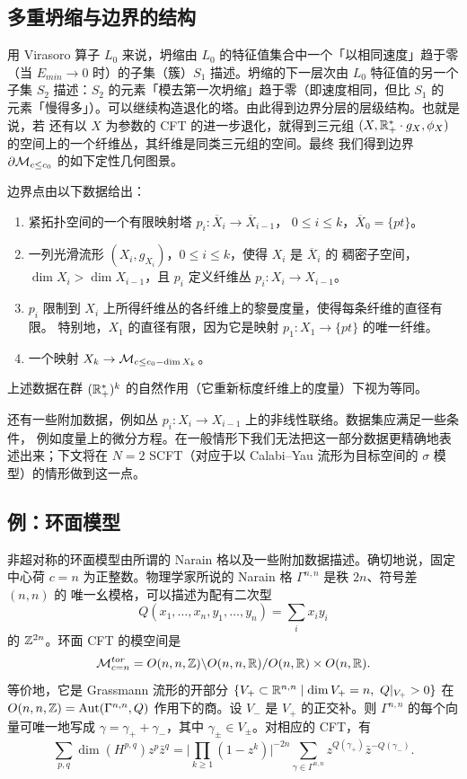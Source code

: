 \subsection{多重坍缩与边界的结构}

用 Virasoro 算子 $L_0$ 来说，坍缩由 $L_0$ 的特征值集合中一个「以相同速度」趋于零
（当 $E_{min}\to0$ 时）的子集（簇）$S_1$ 描述。坍缩的下一层次由 $L_0$ 特征值的另一个
子集 $S_2$ 描述：$S_2$ 的元素「模去第一次坍缩」趋于零（即速度相同，但比 $S_1$ 的
元素「慢得多」）。可以继续构造退化的塔。由此得到边界分层的层级结构。也就是说，若
还有以 $X$ 为参数的 CFT 的进一步退化，就得到三元组
$(X,\mathbb{R}^*_+\cdot g_X,\phi_X)$ 的空间上的一个纤维丛，其纤维是同类三元组的空间。最终
我们得到边界 $\partial\mathcal{M}_{c\le c_0}$ 的如下定性几何图景。

边界点由以下数据给出：
\begin{enumerate}[label=\arabic*)]
\item 紧拓扑空间的一个有限映射塔 $p_i:\overline{X}_i\to\overline{X}_{i-1}$，
  $0\le i\le k$，$\overline{X}_0=\{pt\}$。
\item 一列光滑流形 $(X_i,g_{X_i})$，$0\le i\le k$，使得 $X_i$ 是 $\overline{X}_i$ 的
  稠密子空间，$\dim X_i>\dim X_{i-1}$，且 $p_i$ 定义纤维丛 $p_i:X_i\to X_{i-1}$。
\item $p_i$ 限制到 $X_i$ 上所得纤维丛的各纤维上的黎曼度量，使得每条纤维的直径有限。
  特别地，$X_1$ 的直径有限，因为它是映射 $p_1:X_1\to\{pt\}$ 的唯一纤维。
\item 一个映射 $X_k\to\mathcal{M}_{c\le c_0-\dim X_k}$。
\end{enumerate}

上述数据在群 $(\mathbb{R}^*_+)^k$ 的自然作用（它重新标度纤维上的度量）下视为等同。

还有一些附加数据，例如丛 $p_i:X_i\to X_{i-1}$ 上的非线性联络。数据集应满足一些条件，
例如度量上的微分方程。在一般情形下我们无法把这一部分数据更精确地表述出来；下文将在
$N=2$ SCFT（对应于以 Calabi--Yau 流形为目标空间的 $\sigma$ 模型）的情形做到这一点。

\subsection{例：环面模型}

非超对称的环面模型由所谓的 Narain 格以及一些附加数据描述。确切地说，固定中心荷
$c=n$ 为正整数。物理学家所说的 Narain 格 $\Gamma^{n,n}$ 是秩 $2n$、符号差 $(n,n)$ 的
唯一幺模格，可以描述为配有二次型
\[
  Q(x_1,\dots,x_n,y_1,\dots,y_n)=\sum_i x_iy_i
\]
的 $\mathbb{Z}^{2n}$。环面 CFT 的模空间是
\[
  \mathcal{M}^{tor}_{c=n}=O(n,n,\mathbb{Z})\backslash O(n,n,\mathbb{R})/O(n,\mathbb{R})\times O(n,\mathbb{R}).
\]
等价地，它是 Grassmann 流形的开部分
$\{V_+\subset\mathbb{R}^{n,n}\mid\dim V_+=n,\ Q|_{V_+}>0\}$ 在
$O(n,n,\mathbb{Z})=\operatorname{Aut}(\Gamma^{n,n},Q)$ 作用下的商。设 $V_-$ 是 $V_+$ 的正交补。则
$\Gamma^{n,n}$ 的每个向量可唯一地写成 $\gamma=\gamma_++\gamma_-$，其中
$\gamma_\pm\in V_\pm$。对相应的 CFT，有
\[
  \sum_{p,q}\dim(H^{p,q})z^p\bar z^q
  =\Big|\prod_{k\ge1}(1-z^k)\Big|^{-2n}
   \sum_{\gamma\in\Gamma^{n,n}}z^{Q(\gamma_+)}\bar z^{-Q(\gamma_-)}.
\]


